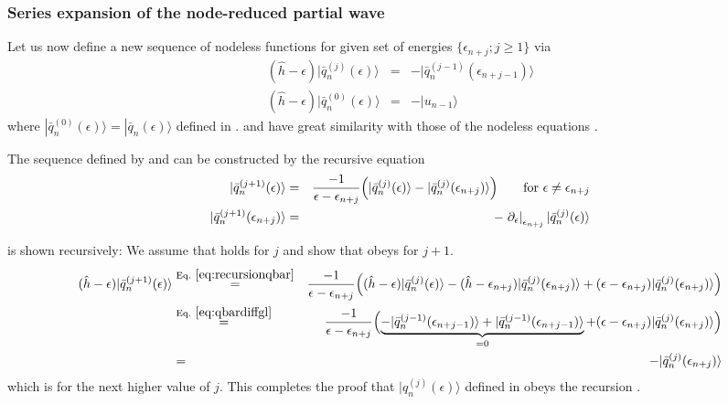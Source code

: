 \documentclass[11pt,a4paper]{report}
\begin{document}
\subsubsection{Series expansion of the node-reduced partial wave}
Let us now define \cite{bloechl12_arxiv1210_5937} a new sequence of
nodeless functions for given set of energies $\{\epsilon_{n+j}; j\ge1\}$ via
\begin{eqnarray}
(\hat{h}-\epsilon)|\bar{q}_{n}^{(j)}(\epsilon)\rangle&=&
-|\bar{q}_n^{(j-1)}(\epsilon_{n+j-1})\rangle
\label{eq:qbardiffgl}
\\
(\hat{h}-\epsilon)|\bar{q}_{n}^{(0)}(\epsilon)\rangle&=&-|u_{n-1}\rangle 
\label{eq:qbardiffgl0}
\end{eqnarray}
where
$|\bar{q}_{n}^{(0)}(\epsilon)\rangle=|\bar{q}_{n}(\epsilon)\rangle$
defined in .  and
 have great similarity with those of
the nodeless equations .


The sequence defined by  and  can
be constructed by the recursive equation
\begin{eqnarray}
|\bar{q}_{n}^{(j+1)}(\epsilon)\rangle&=&
\frac{-1}{\epsilon-\epsilon_{n+j}}
\Bigl(|\bar{q}_n^{(j)}(\epsilon)\rangle
-|\bar{q}_n^{(j)}(\epsilon_{n+j})\rangle\Bigr)
\qquad\text{for $\epsilon\ne\epsilon_{n+j}$}
\nonumber\\
|\bar{q}_{n}^{(j+1)}(\epsilon_{n+j})\rangle&=&
-\left.\partial_\epsilon\right|_{\epsilon_{n+j}}|\bar{q}_n^{(j)}(\epsilon)\rangle
\label{eq:recursionqbar}
\end{eqnarray}

 is shown recursively: We assume that
 holds for $j$ and show that  
obeys  for $j+1$.
\begin{eqnarray}
(\hat{h}-\epsilon)|\bar{q}^{(j+1)}_{n}(\epsilon)\rangle
&\eqrel{eq:recursionqbar}{=}&
\frac{-1}{\epsilon-\epsilon_{n+j}}
\Bigl((\hat{h}-\epsilon)|\bar{q}_n^{(j)}(\epsilon)\rangle
-(\hat{h}-\epsilon_{n+j})|\bar{q}_n^{(j)}(\epsilon_{n+j})\rangle
+(\epsilon-\epsilon_{n+j})|\bar{q}_n^{(j)}(\epsilon_{n+j})\rangle
\Bigr)
\nonumber\\
&\eqrel{eq:qbardiffgl}{=}&
\frac{-1}{\epsilon-\epsilon_{n+j}}
\Bigl(
\underbrace{-|\bar{q}_n^{(j-1)}(\epsilon_{n+j-1})\rangle
+|\bar{q}_n^{(j-1)}(\epsilon_{n+j-1})\rangle}_{=0}
+(\epsilon-\epsilon_{n+j})|\bar{q}_n^{(j)}(\epsilon_{n+j})\rangle
\Bigr)
\nonumber\\
&=&
-|\bar{q}_n^{(j)}(\epsilon_{n+j})\rangle
\end{eqnarray}
which is  for the next higher value of $j$. This
completes the proof that $|q_{n}^{(j)}(\epsilon)\rangle$ defined in
 obeys the recursion .
\end{document}
